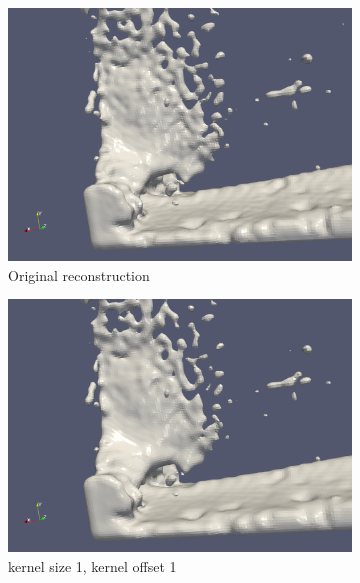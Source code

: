 \begin{figure}
        \begin{subfigure}[b]{0.5\textwidth}
               \includegraphics[width=\textwidth]{figures/DBBlur_ks-0_ko-0_2.png}
               \caption{Original reconstruction}
               \label{fig:kskdOrig2}
        \end{subfigure}
        \begin{subfigure}[b]{0.5\textwidth}
               \includegraphics[width=\textwidth]{figures/DBBlur_ks-1_ko-1_2.png}
               \caption{kernel size 1, kernel offset 1}
               \label{fig:ks1ko12}
        \end{subfigure}
        \begin{subfigure}[b]{0.5\textwidth}

\end{subfigure}
\end{figure}

